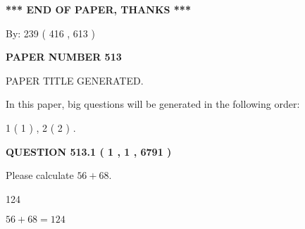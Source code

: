\documentclass[12pt]{article}
\begin{document}
   
\vspace{1.0in} 
{\textbf{\large{ *** END OF PAPER, THANKS *** }}} 
   
   
\hspace{1.0in} By: 
 239 ( 416 ,  613 )
   
   
   
   
\newpage 
\setcounter{page}{ 
   513001 } 
   
   
   
   
 {\textbf{ \Large{ PAPER NUMBER  513  }}}
   
   
\vspace{0.2in}
   
   
   
   
   
   
   
   
 \vspace{0.2in}
 
 
 
 
   
   
 PAPER TITLE GENERATED.
   
   
   
\vspace{0.2in}
   
In this paper, big questions will be generated in the following order: 
   
   
   1 ( 1 )
 ,
   2 ( 2 )
 .
  
\vspace{0.2in}
  
{\textbf{\Large{QUESTION
513.1 
 ( 1 , 1 , 6791 )
}}}
  
  
 
Please calculate $ %
56 +  %
68 $.
 
 
 
\noindent{}
 
 

124
 
 
\noindent{}
 
 

 
 
 
\noindent{}
 
 

$ %
56 +  %
68=   %
124$
 
\end{document}
